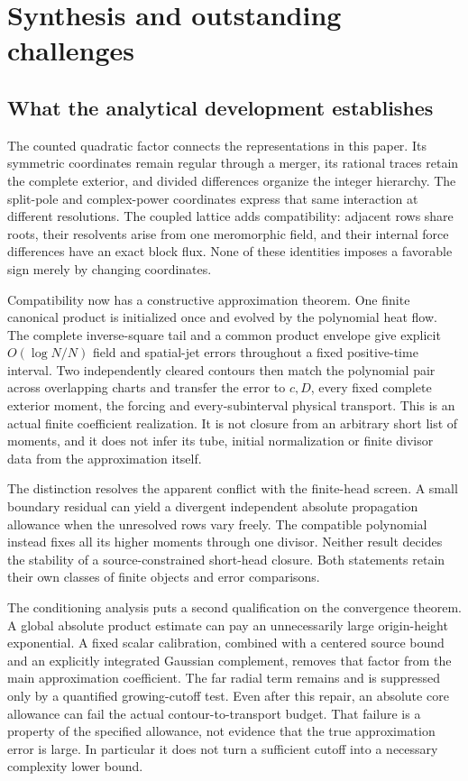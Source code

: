 \section{Synthesis and outstanding challenges}
\label{sec:discussion}

\subsection{What the analytical development establishes}

The counted quadratic factor connects the representations in this paper.
Its symmetric coordinates remain regular through a merger, its rational
traces retain the complete exterior, and divided differences organize the
integer hierarchy. The split-pole and complex-power coordinates express
that same interaction at different resolutions. The coupled lattice adds
compatibility: adjacent rows share roots, their resolvents arise from one
meromorphic field, and their internal force differences have an exact
block flux. None of these identities imposes a favorable sign merely by
changing coordinates.

Compatibility now has a constructive approximation theorem. One finite
canonical product is initialized once and evolved by the polynomial heat
flow. The complete inverse-square tail and a common product envelope give
explicit $O(\log N/N)$ field and spatial-jet errors throughout a fixed
positive-time interval. Two independently cleared contours then match the
polynomial pair across overlapping charts and transfer the error to
$c,D$, every fixed complete exterior moment, the forcing and
 every-subinterval physical transport. This is an actual finite
coefficient realization. It is not closure from an arbitrary short list
of moments, and it does not infer its tube, initial normalization or
finite divisor data from the approximation itself.

The distinction resolves the apparent conflict with the finite-head
screen. A small boundary residual can yield a divergent independent
absolute propagation allowance when the unresolved rows vary freely.
The compatible polynomial instead fixes all its higher moments through
one divisor. Neither result decides the stability of a source-constrained
short-head closure. Both statements retain their own classes of finite
objects and error comparisons.

The conditioning analysis puts a second qualification on the convergence
theorem. A global absolute product estimate can pay an unnecessarily large
origin-height exponential. A fixed scalar calibration, combined with a
centered source bound and an explicitly integrated Gaussian complement,
removes that factor from the main approximation coefficient. The far
radial term remains and is suppressed only by a quantified growing-cutoff
test. Even after this repair, an absolute core allowance can fail the
actual contour-to-transport budget. That failure is a property of the
specified allowance, not evidence that the true approximation error is
large. In particular it does not turn a sufficient cutoff into a
necessary complexity lower bound.

